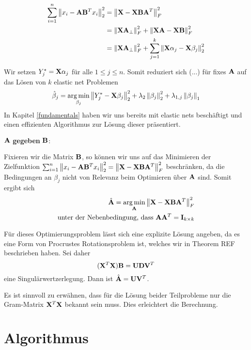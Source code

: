 \begin{align*}
\sum_{i=1}^{n} \left\lVert x_i - \mathbf{A}\mathbf{B}^Tx_i \right\rVert_2^2 & = \left\lVert \mathbf{X} - \mathbf{X} \mathbf{B} \mathbf{A}^T \right\rVert_F^{2}\\
& = \left\lVert \mathbf{X} \mathbf{A}_{\perp} \right\rVert_F^2 + \left\lVert \mathbf{X} \mathbf{A} - \mathbf{X} \mathbf{B} \right\rVert_F^2\\
& = \left\lVert \mathbf{X} \mathbf{A}_{\perp} \right\rVert_F^2 + \sum_{j=1}^{k}\left\lVert \mathbf{X} \alpha_j - \mathbf{X}\beta_j \right\rVert_2^2
\end{align*}

Wir setzen $Y_j^* = \mathbf{X} \alpha_j$ für alle $1 \leq j \leq n$. Somit reduziert sich (...) für fixes $\mathbf{A}$ auf das Lösen von $k$ elastic net Problemen
\begin{align}
\label{sub_problem_enet}
\hat{\beta}_j = \operatorname*{arg\,min}_{\beta_j} \left\lVert Y_j^* - \mathbf{X} \beta_j \right\rVert_2^2 + \lambda_2 \left\lVert \beta_j \right\rVert_2^2 + \lambda_{1,j}\left\lVert \beta_j \right\rVert_1
\end{align}
In Kapitel \ref{fundamentals} haben wir uns bereits mit elastic nets beschäftigt und einen effizienten Algorithmus zur Lösung dieser präsentiert.

$\mathbf{A}$ \textbf{gegeben} $\mathbf{B}$:

Fixieren wir die Matrix $\mathbf{B}$, so können wir uns auf das Minimieren der Zielfunktion $\sum_{i=1}^{n} \left\lVert x_i - \mathbf{A}\mathbf{B}^Tx_i \right\rVert_2^2 = \left\lVert \mathbf{X} - \mathbf{X} \mathbf{B} \mathbf{A}^T \right\rVert_F^{2}$ beschränken, da die Bedingungen an $\beta_j$ nicht von Relevanz beim Optimieren über $\mathbf{A}$ sind. Somit ergibt sich 
\begin{align}
\label{sub_problem_procrustes}
\begin{split}
\hat{\mathbf{A}} = \operatorname*{arg\,min}_{\mathbf{A}}\left\lVert \mathbf{X} - \mathbf{X} \mathbf{B} \mathbf{A}^T \right\rVert_F^2\\
\text{unter der Nebenbedingung, dass } \mathbf{A} \mathbf{A}^T = \mathbf{I}_{k \times k}
\end{split}
\end{align}

Für dieses Optimierungsproblem lässt sich eine explizite Lösung angeben, da es eine Form von Procrustes Rotationsproblem ist, welches wir in Theorem REF beschrieben haben. Sei daher 
$$(\mathbf{X}^T \mathbf{X}) \mathbf{B} = \mathbf{U} \mathbf{D} \mathbf{V}^T$$ eine Singulärwertzerlegung. Dann ist $\hat{\mathbf{A}} = \mathbf{U} \mathbf{V}^T$.

Es ist sinnvoll zu erwähnen, dass für die Lösung beider Teilprobleme nur die Gram-Matrix $\mathbf{X}^T \mathbf{X}$ bekannt sein muss. Dies erleichtert die Berechnung.

\section{Algorithmus}

